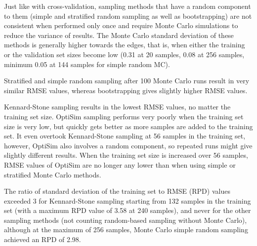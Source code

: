 \documentclass{isprs}
\begin{document}
Just like with cross-validation, sampling methods that have a random component to them (simple and stratified random sampling as well as bootstrapping) are not consistent when performed only once and require Monte Carlo simulations to reduce the variance of results. The Monte Carlo standard deviation of these methods is generally higher towards the edges, that is, when either the training or the validation set sizes become low (0.31 at 20 samples, 0.08 at 256 samples, minimum 0.05 at 144 samples for simple random MC).

Stratified and simple random sampling after 100 Monte Carlo runs result in very similar RMSE values, whereas bootstrapping gives slightly higher RMSE values.

Kennard-Stone sampling results in the lowest RMSE values, no matter the training set size. OptiSim sampling performs very poorly when the training set size is very low, but quickly gets better as more samples are added to the training set. It even overtook Kennard-Stone sampling at 56 samples in the training set, however, OptiSim also involves a random component, so repeated runs might give slightly different results. When the training set size is increased over 56 samples, RMSE values of OptiSim are no longer any lower than when using simple or stratified Monte Carlo methods.

The ratio of standard deviation of the training set to RMSE (RPD) values exceeded 3 for Kennard-Stone sampling starting from 132 samples in the training set (with a maximum RPD value of 3.58 at 240 samples), and never for the other sampling methods (not counting random-based sampling without Monte Carlo), although at the maximum of 256 samples, Monte Carlo simple random sampling achieved an RPD of 2.98.
\end{document}
